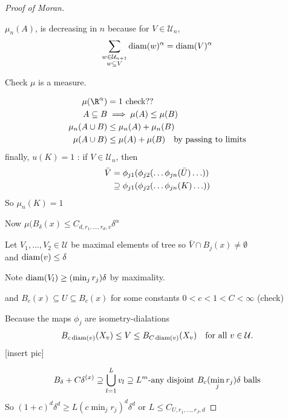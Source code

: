 \begin{proof}[Proof of Moran]
\begin{remark}
	$\mu_n (A)$, is decreasing in $n$ because for $V \in \mathcal{U}_n$,
	\begin{align*}
		\sum_{\substack{w \in \mathcal{U}_{n+1} \\ w \subseteq V}} \operatorname*{diam} (w)^{\alpha} = \operatorname*{diam} (V)^{\alpha}
	\end{align*} 
\end{remark}

Check $\mu$ is a measure.

\begin{align*}
	\mu(\R^{\alpha}) &= 1 \text{   check??} \\
	A \subseteq B &\implies \mu(A) \leq \mu (B) \\
	\mu_{n} (A \cup B ) &\leq \mu_{n} (A) + \mu_{n} (B) \\
	\mu (A \cup B ) &\leq \mu (A) + \mu (B) \quad \text{by passing to limits} \\
\end{align*} 
finally,
$u(K) = 1$ : if $V \in \mathcal{U}_{n}$, then
\begin{align*}
	\bar{V} &= \phi_{j1}( \phi_{j2} ( \ldots \phi_{jn} (\bar{U}) \ldots )) \\
			&\supseteq \phi_{j1}( \phi_{j2} ( \ldots \phi_{jn} (K) \ldots )) \\
\end{align*} So $\mu_n (K) = 1$


Now $\mu (B_{\delta} (x) \leq C_{d,r_{1},\ldots, r_{d}, v} \delta^{\alpha}$ 

Let $V_{1}, \ldots, V_{2} \in \mathcal{U}$ be maximal elements of tree so $\bar{V} \cap B_{j} (x) \neq \emptyset$ \\
and $\operatorname*{diam}(v) \leq \delta$ 


\begin{remark}
	Note $\operatorname*{diam}(V_{l}) \geq (\min_{j} r_{j} ) \delta$ by maximality.

	and $B_{c}(x) \subseteq U \subseteq B_{c} (x)$ for some constants $0 < c < 1 < C < \infty$ (check)
\end{remark}

Because the maps $\phi_{j}$ are isometry-dialations
\begin{align*}
	B_{c \operatorname*{diam}(v)} (X_{v}) \leq V \leq B_{C \operatorname*{diam} (v)} (X_{v}) \quad \text{for all } v \in \mathcal{U}.
\end{align*} [insert pic]

\begin{align*}
	B_{\delta} + C \delta^{(x)} \supseteq \bigcup_{l =1}^{L} v_{l} \supseteq L^{m}\text{-any disjoint } B_{c} (\min_{j} r_{j}) \delta \text{ balls}
\end{align*} 
So $(1+c)^{d} \delta^{d} \geq L (c \min_{j} r_{j})^{d} \delta^{d}$ or $L \leq C_{U, r_{1}, \ldots, r_{J}, d}$


\end{proof}
